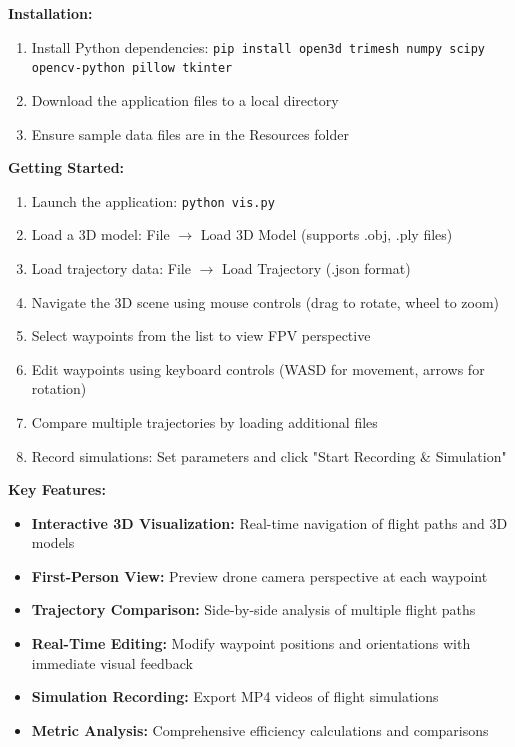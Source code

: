 \documentclass[11pt,a4paper]{article}
\begin{document}
\textbf{Installation:}
\begin{enumerate}
\item Install Python dependencies: \texttt{pip install open3d trimesh numpy scipy opencv-python pillow tkinter}
\item Download the application files to a local directory
\item Ensure sample data files are in the Resources folder
\end{enumerate}

\textbf{Getting Started:}
\begin{enumerate}
\item Launch the application: \texttt{python vis.py}
\item Load a 3D model: File $\rightarrow$ Load 3D Model (supports .obj, .ply files)
\item Load trajectory data: File $\rightarrow$ Load Trajectory (.json format)
\item Navigate the 3D scene using mouse controls (drag to rotate, wheel to zoom)
\item Select waypoints from the list to view FPV perspective
\item Edit waypoints using keyboard controls (WASD for movement, arrows for rotation)
\item Compare multiple trajectories by loading additional files
\item Record simulations: Set parameters and click "Start Recording \& Simulation"
\end{enumerate}

\textbf{Key Features:}
\begin{itemize}
\item \textbf{Interactive 3D Visualization:} Real-time navigation of flight paths and 3D models
\item \textbf{First-Person View:} Preview drone camera perspective at each waypoint
\item \textbf{Trajectory Comparison:} Side-by-side analysis of multiple flight paths
\item \textbf{Real-Time Editing:} Modify waypoint positions and orientations with immediate visual feedback
\item \textbf{Simulation Recording:} Export MP4 videos of flight simulations
\item \textbf{Metric Analysis:} Comprehensive efficiency calculations and comparisons
\end{itemize}
\end{document}
